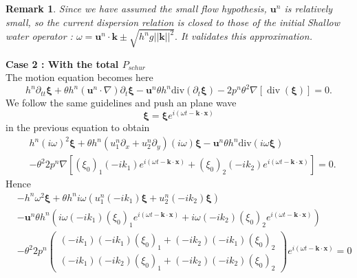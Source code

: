 \documentclass[a4paper, 11pt]{report}
\newtheorem{Remark}{Remark}
\begin{document}
\begin{Remark}
Since we have assumed the small flow hypothesis, $\boldsymbol{u}^n$ is relatively small, so the current dispersion relation is closed to those of the initial Shallow water operator : $\omega=\boldsymbol{u}^n\cdot \boldsymbol{k}\pm\sqrt{h^ng||\boldsymbol{k}||^2}.$ It validates this approximation.
\end{Remark}
\noindent\textbf{Case 2 : With the total $P_{schur}$}\\
The motion equation becomes here
\begin{equation*}
h^n\partial_{tt} \boldsymbol{\xi}+\theta h^n\left(\boldsymbol{u}^n\cdot\nabla\right) \partial_t\boldsymbol{\xi}- \boldsymbol{u}^n\theta h^n\text{div}\left(\partial_t \boldsymbol{\xi}\right)
-2p^n \theta^2 \nabla\left[\operatorname{div}( \boldsymbol{\xi}) \right]=0.
\end{equation*}
We follow the same guidelines and push an plane wave
\begin{equation*}
\boldsymbol{\xi}=\boldsymbol{\xi}e^{i(\omega t-\boldsymbol{k}\cdot \boldsymbol{x})}
\end{equation*}
in the previous equation to obtain
\begin{equation*}
\begin{split}
&h^n(i\omega)^2\boldsymbol{\xi}+\theta h^n (u_1^n\partial_x+u_2^n\partial_y)(i\omega)\boldsymbol{\xi}-\boldsymbol{u}^n\theta h^n\text{div}\left(i\omega\boldsymbol{\xi}\right)\\
&-\theta^2 2p^n\nabla \left[(\xi_0)_1(-ik_1)e^{i(\omega t-\boldsymbol{k}\cdot \boldsymbol{x})}+(\xi_0)_2(-ik_2)e^{i(\omega t-\boldsymbol{k}\cdot \boldsymbol{x})}\right]=0.
\end{split}
\end{equation*}
Hence
\begin{equation*}
\begin{split}
&-h^n\omega^2\boldsymbol{\xi}+\theta h^n i\omega\left(u_1^n(-ik_1)\boldsymbol{\xi}+u_2^n(-ik_2)\boldsymbol{\xi}\right)\\
&-\boldsymbol{u}^n\theta h^n\left(i\omega (-i k_1)(\xi_0)_1e^{i(\omega t-\boldsymbol{k}\cdot \boldsymbol{x})}+i\omega (-ik_2)(\xi_0)_2e^{i(\omega t-\boldsymbol{k}\cdot \boldsymbol{x})}\right)\\
&-\theta^2 2p^n\begin{pmatrix}(-ik_1)(-ik_1)(\xi_0)_1+(-ik_2)(-ik_1)(\xi_0)_2\\(-ik_1)(-ik_2)(\xi_0)_1+(-ik_2)(-ik_2)(\xi_0)_2\end{pmatrix}e^{i(\omega t-\boldsymbol{k}\cdot \boldsymbol{x})}=0
\end{split}
\end{equation*}
\end{document}
